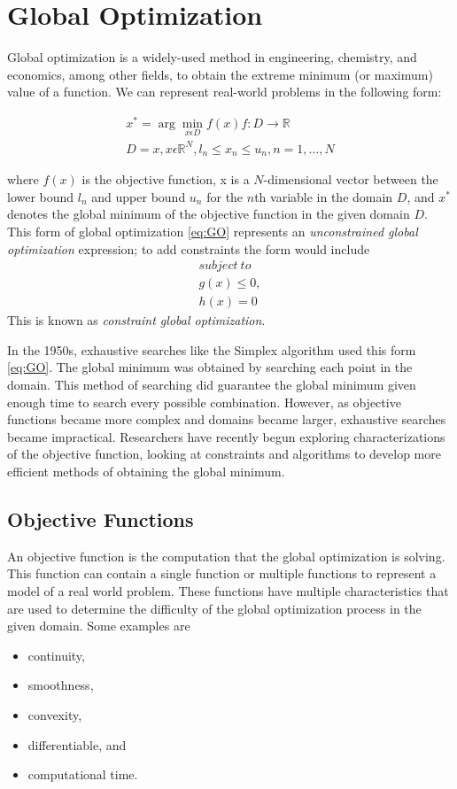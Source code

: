 \chapter{Global Optimization}
\label{background}
Global optimization is a widely-used method in engineering, chemistry, and economics, among other fields, to obtain the extreme minimum (or maximum) value of a function. We can represent real-world problems in the following form:

\begin{gather}
  x^* = \arg \min_{x \epsilon D} f(x) 
  f:D\rightarrow \mathbb{R} \\ 
  D = {x,x\epsilon \mathbb{R}^{N},l_n\leq x_n \leq u_n, n = 1,\ldots,N} 
  \label{eq:GO}
\end{gather}

where $f(x)$ is the objective function, x is a $N$-dimensional vector between the lower bound $l_n$ and upper bound $u_n$ for the $n$th variable in the domain $D$, and $x^*$ denotes the global minimum of the objective function in the given domain $D$. This form of global optimization \eqref{eq:GO} represents an \textit{unconstrained global optimization} expression; to add constraints the form would include 
\begin{align}
  \label{eq:constrainedGO}
  subject\ to \nonumber \\
    g(x) \leq 0, \\ 
    h(x) = 0 \nonumber
\end{align}
This is known as \textit{constraint global optimization}.

In the 1950s, exhaustive searches like the Simplex algorithm \cite{Liberti2000} used this form \eqref{eq:GO}. The global minimum was obtained by searching each point in the domain. This method of searching did guarantee the global minimum given enough time to search every possible combination. However, as objective functions became more complex and domains became larger, exhaustive searches became impractical. Researchers have recently begun exploring characterizations of the objective function, looking at constraints and algorithms to develop more efficient methods of obtaining the global minimum. 

\clearpage
\section{Objective Functions}
An objective function is the computation that the global optimization is solving. This function can contain a single function or multiple functions to represent a model of a real world problem. These functions have multiple characteristics that are used to determine the difficulty of the global optimization process in the given domain. Some examples are
\begin{itemize}
  \item continuity,
  \item smoothness,
  \item convexity,
  \item differentiable, and
  \item computational time.
\end{itemize}


